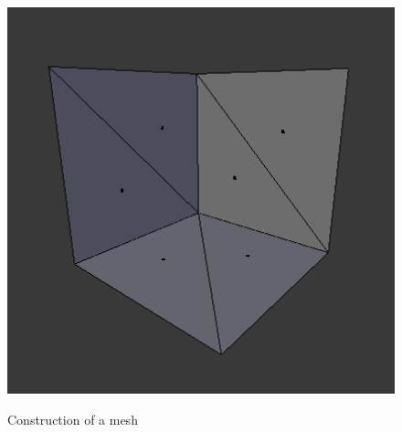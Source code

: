 \begin{figure}[htp]
{        \includegraphics[height=\twosubht]{tex/img/ch03/Basics04_Meshes.png}
    }
    \caption{Construction of a mesh}
    \label{fig:3d-mesh-construction}
\end{figure}


